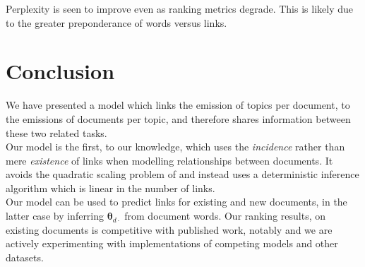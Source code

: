 \documentclass{sciposter}
\newcommand \vv[1] { \bm #1 }
\newcommand \thdo { { \vv{\theta}_{d\cdot} } }
\begin{document}
\begin{multicols}{3}
Perplexity is seen to improve even as ranking metrics degrade. This is likely due to the greater preponderance of words versus links.

\section{Conclusion}
We have presented a model which links the emission of topics per document, to the emissions of documents per topic, and therefore shares information between these two related tasks. \\

Our model is the first, to our knowledge, which uses the \emph{incidence} rather than mere \emph{existence} of links when modelling relationships between documents. It avoids the quadratic scaling problem of \cite{Chang2009a} and instead uses a deterministic inference algorithm which is linear in the number of links.\\

Our model can be used to predict links for existing and new documents, in the latter case by inferring $\thdo$ from document words. Our ranking results, on existing documents is competitive with published work, notably \cite{Chang2009a}\cite{Neiswanger2014} and we are actively experimenting with implementations of competing models and other datasets.

 






\end{multicols}
\end{document}
